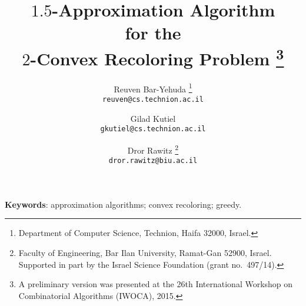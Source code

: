 \title{\bf $1.5$-Approximation Algorithm	\\
for the 									\\ 
$2$-Convex Recoloring Problem%
\thanks{A preliminary version was presented at the 26th
International Workshop on Combinatorial Algorithms (IWOCA), 2015.}
}

\begin{titlepage}

\author{%
Reuven Bar-Yehuda%
\thanks{Department of Computer Science, Technion, Haifa 32000, Israel.}
\\
{\tt\small reuven@cs.technion.ac.il}
\and
Gilad Kutiel\footnotemark[2] \\
{\tt\small gkutiel@cs.technion.ac.il}
\and
Dror Rawitz%
\thanks{Faculty of Engineering, Bar Ilan University, Ramat-Gan 52900,
Israel.  Supported in part by the Israel Science Foundation (grant
no.~497/14).} \\
{\tt\small dror.rawitz@biu.ac.il}
%
}

\date{}

\maketitle



\medskip

\noindent
\textbf{Keywords}:
approximation algorithms; convex recoloring; greedy.

\renewcommand{\thepage}{}
\end{titlepage}

